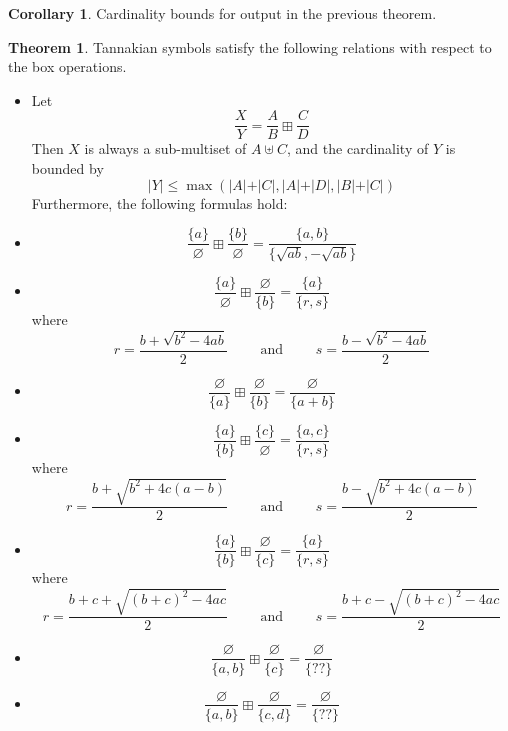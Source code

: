\documentclass[a4paper]{article}
\theoremstyle{definition}
\newtheorem{theorem}{Theorem}[section]
\newtheorem*{corollary}{Corollary}
\theoremstyle{remark}
\begin{document}
\begin{corollary}
Cardinality bounds for output in the previous theorem.
\end{corollary}

\begin{theorem}
Tannakian symbols satisfy the following relations with respect to the box operations.
\begin{itemize}
\item[1.] Let $$\frac{X}{Y} = \frac{A}{B} \boxplus \frac{C}{D}$$
Then $X$ is always a sub-multiset of $A \uplus C$, and the cardinality of $Y$ is bounded by
$$ \vert Y \vert \leq \max ( \vert A \vert + \vert C \vert,  \vert A \vert + \vert D \vert,  \vert B \vert + \vert C \vert  )   $$
Furthermore, the following formulas hold:
\item[1a.] $$\frac{\{ a \} }{\varnothing} \boxplus \frac{ \{ b \} }{\varnothing} = \frac{ \{ a, b \}  }{ \{ \sqrt{ab} , -\sqrt{ab} \} }$$

\item[1b.] $$\frac{\{ a \} }{\varnothing} \boxplus \frac{\varnothing}{ \{ b \} } = \frac{ \{ a \}  }{ \{ r , s \} }$$
where
$$r = \frac{b + \sqrt{b^2 - 4ab}}{2} \qquad \text{\ and\ } \qquad s = \frac{b - \sqrt{b^2 - 4ab}}{2}$$

\item[1c.] $$\frac{\varnothing}{\{ a \} } \boxplus \frac{\varnothing}{ \{ b \} } = \frac{ \varnothing  }{ \{ a+b \} }$$

\item[1d.] $$ \frac{ \{ a \} }{ \{ b \}  }  \boxplus \frac{ \{ c \} }{ \varnothing  }   = \frac{\{ a, c  \}}{ \{ r, s \} }    $$
where
$$r = \frac{b + \sqrt{b^2+4c(a-b)}}{2} \qquad \text{\ and\ } \qquad s = \frac{b - \sqrt{b^2+4c(a-b)}}{2}$$

\item[1e.] $$ \frac{ \{ a \} }{ \{ b \}  }  \boxplus \frac{ \varnothing  }{ \{ c \} }  = \frac{\{ a  \}}{ \{ r, s \} }    $$
where
$$r = \frac{b+c + \sqrt{(b+c)^2 - 4ac}}{2} \qquad \text{\ and\ } \qquad s = \frac{b+c - \sqrt{(b+c)^2 - 4ac}}{2}$$

\item[1f.] $$\frac{\varnothing}{\{ a , b \} } \boxplus \frac{\varnothing}{ \{ c \} } = \frac{ \varnothing  }{ \{ ?? \} }$$



\item[1g.] $$\frac{\varnothing}{\{ a , b \} } \boxplus \frac{\varnothing}{ \{ c , d \} } = \frac{ \varnothing  }{ \{ ?? \} }$$



\end{itemize}
\end{theorem}
\end{document}
